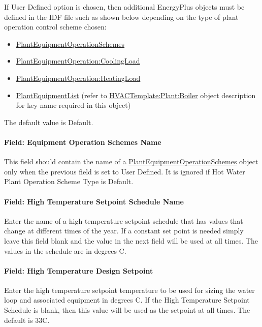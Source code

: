 If User Defined option is chosen, then additional EnergyPlus objects must be defined in the IDF file such as shown below depending on the type of plant operation control scheme chosen:

\begin{itemize}
\item
  \hyperref[plantequipmentoperationschemes]{PlantEquipmentOperationSchemes}
\item
  \hyperref[plantequipmentoperationcoolingload]{PlantEquipmentOperation:CoolingLoad}
\item
  \hyperref[plantequipmentoperationheatingload]{PlantEquipmentOperation:HeatingLoad}
\item
  \hyperref[plantequipmentlist]{PlantEquipmentList} (refer to \hyperref[hvactemplateplantboiler]{HVACTemplate:Plant:Boiler} object description for key name required in this object)
\end{itemize}

The default value is Default.

\paragraph{Field: Equipment Operation Schemes Name}\label{field-equipment-operation-schemes-name}

This field should contain the name of a \hyperref[plantequipmentoperationschemes]{PlantEquipmentOperationSchemes} object only when the previous field is set to User Defined. It is ignored if Hot Water Plant Operation Scheme Type is Default.

\paragraph{Field: High Temperature Setpoint Schedule Name}\label{field-high-temperature-setpoint-schedule-name}

Enter the name of a high temperature setpoint schedule that has values that change at different times of the year. If a constant set point is needed simply leave this field blank and the value in the next field will be used at all times. The values in the schedule are in degrees C.

\paragraph{Field: High Temperature Design Setpoint}\label{field-high-temperature-design-setpoint}

Enter the high temperature setpoint temperature to be used for sizing the water loop and associated equipment in degrees C. If the High Temperature Setpoint Schedule is blank, then this value will be used as the setpoint at all times. The default is 33C.

